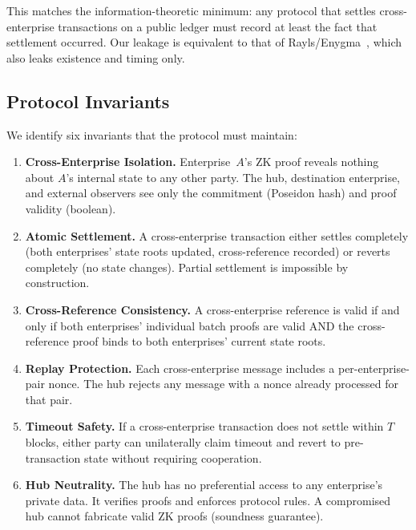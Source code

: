 \documentclass[conference]{IEEEtran}
\begin{document}
This matches the information-theoretic minimum: any protocol that settles
cross-enterprise transactions on a public ledger must record at least the
fact that settlement occurred. Our leakage is equivalent to that of
Rayls/Enygma~\cite{rayls2025}, which also leaks existence and timing only.

\subsection{Protocol Invariants}
\label{sec:invariants}

We identify six invariants that the protocol must maintain:

\begin{enumerate}
  \item[\textbf{INV-CE5}] \textbf{Cross-Enterprise Isolation.}
    Enterprise~$A$'s ZK proof reveals nothing about $A$'s internal state to
    any other party. The hub, destination enterprise, and external observers
    see only the commitment (Poseidon hash) and proof validity (boolean).

  \item[\textbf{INV-CE6}] \textbf{Atomic Settlement.}
    A cross-enterprise transaction either settles completely (both
    enterprises' state roots updated, cross-reference recorded) or reverts
    completely (no state changes). Partial settlement is impossible by
    construction.

  \item[\textbf{INV-CE7}] \textbf{Cross-Reference Consistency.}
    A cross-enterprise reference is valid if and only if both enterprises'
    individual batch proofs are valid AND the cross-reference proof binds to
    both enterprises' current state roots.

  \item[\textbf{INV-CE8}] \textbf{Replay Protection.}
    Each cross-enterprise message includes a per-enterprise-pair nonce. The
    hub rejects any message with a nonce already processed for that pair.

  \item[\textbf{INV-CE9}] \textbf{Timeout Safety.}
    If a cross-enterprise transaction does not settle within $T$ blocks,
    either party can unilaterally claim timeout and revert to pre-transaction
    state without requiring cooperation.

  \item[\textbf{INV-CE10}] \textbf{Hub Neutrality.}
    The hub has no preferential access to any enterprise's private data. It
    verifies proofs and enforces protocol rules. A compromised hub cannot
    fabricate valid ZK proofs (soundness guarantee).
\end{enumerate}
\end{document}
